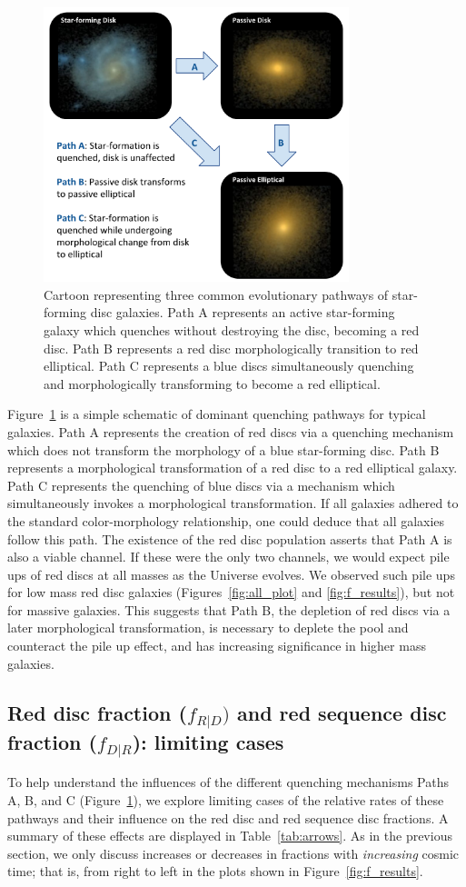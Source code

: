 \documentclass[useAMS,usenatbib]{mn2e}
\begin{document}
\begin{figure}
\centering
\includegraphics[width=3.5in]{figures/cartoon.pdf}
\caption{Cartoon representing three common evolutionary pathways of star-forming disc galaxies. Path A represents an active star-forming galaxy which quenches without destroying the disc, becoming a red disc. Path B represents a red disc morphologically transition to red elliptical. Path C represents a blue discs simultaneously quenching and morphologically transforming to become a red elliptical. }
\label{fig:cartoon}
\end{figure}

Figure~\ref{fig:cartoon} is a simple schematic of dominant quenching pathways for typical galaxies. Path A represents the creation of red discs via a quenching mechanism which does not transform the morphology of a blue star-forming disc. Path B represents a morphological transformation of a red disc to a red elliptical galaxy. Path C represents the quenching of blue discs via a mechanism which simultaneously invokes a morphological transformation. If all galaxies adhered to the standard color-morphology relationship, one could deduce that all galaxies follow this path. The existence of the red disc population asserts that Path A is also a viable channel. If these were the only two channels, we would expect pile ups of red discs at all masses as the Universe evolves. We observed such pile ups for low mass red disc galaxies (Figures~\ref{fig:all_plot} and \ref{fig:f_results}), but not for massive galaxies. This suggests that Path B, the depletion of red discs via a later morphological transformation, is necessary to deplete the pool and counteract the pile up effect, and has increasing significance in higher mass galaxies.  


\subsection{Red disc fraction ($f_{R|D})$ and red sequence disc fraction ($f_{D|R}$): limiting cases}
To help understand the influences of the different quenching mechanisms Paths A, B, and C (Figure~\ref{fig:cartoon}), we explore limiting cases of the relative rates of these pathways and their influence on the red disc and red sequence disc fractions. A summary of these effects are displayed in Table~\ref{tab:arrows}. As in the previous section, we only discuss increases or decreases in fractions with \emph{increasing} cosmic time; that is, from right to left in the plots shown in Figure~\ref{fig:f_results}.
\end{document}
